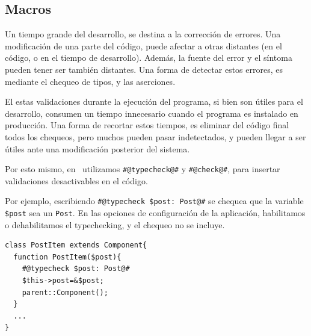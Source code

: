

\subsection{Macros}
\label{sub-macros}

Un tiempo grande del desarrollo, se destina a la corrección de errores. Una modificación de una parte del código, puede afectar a otras distantes (en el código, o en el tiempo de desarrollo). Además, la fuente del error y el síntoma pueden tener ser también distantes. Una forma de detectar estos errores, es mediante el chequeo de tipos, y las aserciones.

El estas validaciones durante la ejecución del programa, si bien son útiles para el desarrollo, consumen un tiempo innecesario cuando el programa es instalado en producción. Una forma de recortar estos tiempos, es eliminar del código final todos los chequeos, pero muchos pueden pasar indetectados, y pueden llegar a ser útiles ante una modificación posterior del sistema.

Por esto mismo, en \PWB\ utilizamos \verb'#@typecheck@#' y \verb'#@check@#', para insertar validaciones desactivables en el código.

Por ejemplo, escribiendo \verb"#@typecheck $post: Post@#" se chequea que la variable \verb"$post"
sea un \verb'Post'. En las opciones de configuración de la aplicación, habilitamos o dehabilitamos el typechecking, y el chequeo no se incluye.

\begin{verbatim}
class PostItem extends Component{
  function PostItem($post){
    #@typecheck $post: Post@#
    $this->post=&$post;
    parent::Component();
  }
  ...
}
\end{verbatim}


